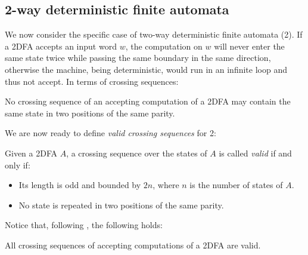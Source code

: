 \subsection{2-way deterministic finite automata}
We now consider the specific case of two-way deterministic finite automata (2\DFAs).
If a 2DFA accepts an input word $w$, the computation on $w$ will never enter the same state twice while passing the same boundary in the same direction, otherwise the machine, being deterministic, would run in an infinite loop and thus not accept.
In terms of crossing sequences:
\begin{fact}\label{fact:crossing-2DFA-parity}
	No crossing sequence of an accepting computation of a 2DFA may contain the same state in two positions of the same parity.
\end{fact}

We are now ready to define \emph{valid crossing sequences} for 2\DFAs:
\begin{defn}
	Given a 2DFA $A$, a crossing sequence over the states of $A$ is called \emph{valid} if and only if:
	\begin{itemize}
		\item Its length is odd and bounded by $2n$, where $n$ is the number of states of $A$.
		\item No state is repeated in two positions of the same parity.
	\end{itemize}
\end{defn}

Notice that, following , the following holds:
\begin{fact}
	All crossing sequences of accepting computations of a 2DFA are valid.
\end{fact}

